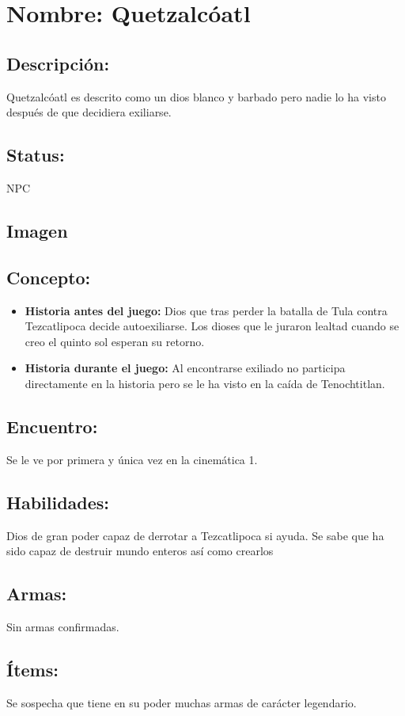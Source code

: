\section{Nombre: Quetzalcóatl}  \label{per:quetzalcoatl}
\subsection{Descripción:}
Quetzalcóatl es descrito como un dios blanco y barbado pero nadie lo ha visto después de que decidiera exiliarse.
\subsection{Status:}
NPC 
\subsection{Imagen}
\subsection{Concepto:}
\begin{itemize}
	\item \textbf{Historia antes del juego:}
	Dios que tras perder la batalla de Tula contra Tezcatlipoca decide autoexiliarse. Los dioses que le juraron lealtad cuando se creo el quinto sol esperan su retorno.
	\item \textbf{Historia durante el juego:}
	Al encontrarse exiliado no participa directamente en la historia pero se le ha visto en la caída de Tenochtitlan.
\end{itemize} 
\subsection{Encuentro:}
Se le ve por primera y única vez en la cinemática 1.
\subsection{Habilidades:}
Dios de gran poder capaz de derrotar a Tezcatlipoca si ayuda. Se sabe que ha sido capaz de destruir mundo enteros así como crearlos
\subsection{Armas:}
Sin armas confirmadas.
\subsection{Ítems:}
Se sospecha que tiene en su poder muchas armas de carácter legendario.
